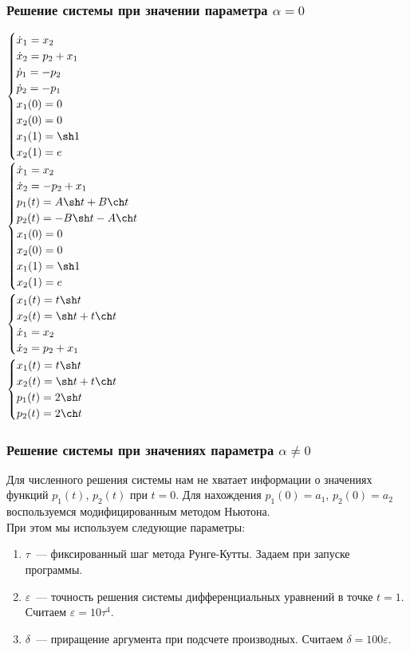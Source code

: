 \documentclass[24pt]{article}
\begin{document}
\subsubsection{Решение системы при значении параметра $\alpha = 0$}
$
\begin{cases}
\dot x_1 = x_2\\
\dot x_2 = p_2 + x_1\\
\dot p_1 = -p_2\\
\dot p_2 = -p_1\\
x_1(0) = 0\\
x_2(0) = 0\\
x_1(1) = \sh 1\\
x_2(1) = e\\
\end{cases}
$\\
$
\begin{cases}
\dot x_1 = x_2\\
\dot x_2 = -p_2 + x_1\\
p_1(t) = A \sh t + B \ch t\\
p_2(t) = -B \sh t - A \ch t\\
x_1(0) = 0\\
x_2(0) = 0\\
x_1(1) = \sh 1\\
x_2(1) = e\\
\end{cases}
$
\\
$
\begin{cases}
x_1(t) = t\sh t\\
x_2(t) = \sh t + t\ch t\\
\dot x_1 = x_2\\
\dot x_2 = p_2 + x_1\\
\end{cases}
$
\\
$
\begin{cases}
x_1(t) = t\sh t\\
x_2(t) = \sh t + t\ch t\\
p_1(t) = 2 \sh t\\
p_2(t) = 2 \ch t\\
\end{cases}
$
\subsubsection{Решение системы при значениях параметра $\alpha \neq 0$}
Для численного решения системы нам не хватает информации о значениях функций $p_1(t)$, $p_2(t)$ при $t = 0$.
Для нахождения $p_1 (0) = a_1$, $p_2(0) = a_2$ воспользуемся модифицированным методом Ньютона.\\
При этом мы используем следующие параметры:
\begin{enumerate}
\item
$\tau$~--- фиксированный шаг метода Рунге-Кутты. Задаем при запуске программы.
\item
$\varepsilon$~--- точность решения системы дифференциальных уравнений в точке $t = 1$. Считаем $\varepsilon = 10\tau^4$.
\item
$\delta$~--- приращение аргумента при подсчете производных. Считаем $\delta = 100\varepsilon$.
\end{enumerate}
\end{document}

